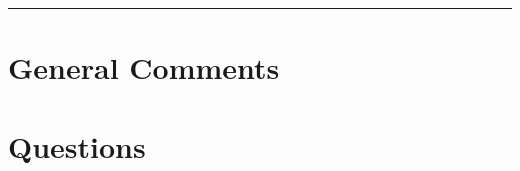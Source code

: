 \documentclass{exam}
\title{}
\date{Markov Chains, Continuous Probability, Conditional Expectation}
\begin{document}
\maketitle
\rule{\textwidth}{0.15em}
\fontsize{12}{15}\selectfont
\thispagestyle{empty}


\section{General Comments}


\section{Questions}
\end{document}
